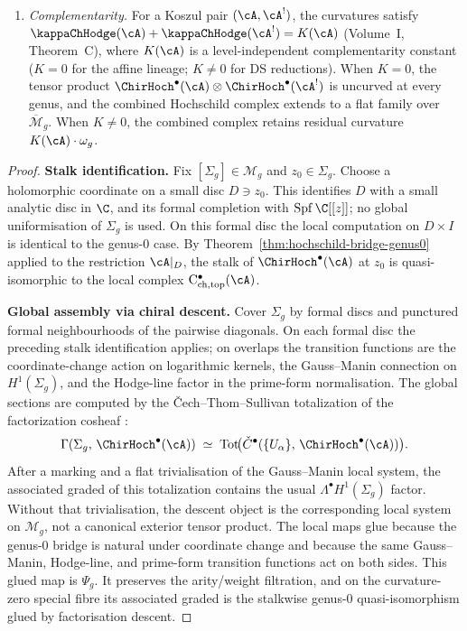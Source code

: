 \begin{theorem}
\begin{enumerate}[label=\textup{(\roman*)}]
\item \emph{Complementarity.}
 For a Koszul pair $(\cA, \cA^!)$, the curvatures satisfy
 $\kappaChHodge(\cA) + \kappaChHodge(\cA^!) = K(\cA)$
 (Volume~I, Theorem~C), where $K(\cA)$ is a level-independent
 complementarity constant ($K = 0$ for the affine lineage;
 $K \neq 0$ for DS reductions). When $K = 0$, the tensor product
 $\ChirHoch^\bullet(\cA) \otimes \ChirHoch^\bullet(\cA^!)$
 is uncurved at every genus, and the combined Hochschild
 complex extends to a flat family over
 $\overline{\mathcal{M}}_g$. When $K \neq 0$, the combined
 complex retains residual curvature $K(\cA) \cdot \omega_g$.
\end{enumerate}
\end{theorem}

\begin{proof}
\textbf{Stalk identification.}
Fix $[\Sigma_g] \in \mathcal{M}_g$ and $z_0 \in \Sigma_g$.
Choose a holomorphic coordinate on a small disc \(D\ni z_0\).  This
identifies \(D\) with a small analytic disc in \(\C\), and its formal
completion with \(\operatorname{Spf}\C[[z]]\); no global
uniformisation of \(\Sigma_g\) is used.  On this formal disc the local
computation on \(D\times I\) is identical to the genus-$0$ case. By
Theorem~\ref{thm:hochschild-bridge-genus0} applied to the
restriction $\cA|_D$, the stalk of $\ChirHoch^\bullet(\cA)$ at
$z_0$ is quasi-isomorphic to the local complex
$\mathrm{C}^\bullet_{\mathrm{ch,top}}(\cA)$.

\textbf{Global assembly via chiral descent.}
Cover $\Sigma_g$ by formal discs and punctured formal
neighbourhoods of the pairwise diagonals. On each formal disc the
preceding stalk identification applies; on overlaps the transition
functions are the coordinate-change action on logarithmic kernels,
the Gauss--Manin connection on \(H^1(\Sigma_g)\), and the Hodge-line
factor in the prime-form normalisation. The global sections are
computed by the \v{C}ech--Thom--Sullivan totalization of the
factorization cosheaf
\cite[Chapter~6]{CG17}:
\begin{equation}\label{eq:cech-ts}
\Gamma(\Sigma_g,\, \ChirHoch^\bullet(\cA))
\;\simeq\;
\mathrm{Tot}\!\bigl(
 \check{C}^\bullet(\{U_\alpha\},\,
 \ChirHoch^\bullet(\cA))
\bigr).
\end{equation}
After a marking and a flat trivialisation of the Gauss--Manin local
system, the associated graded of this totalization contains the usual
\(\Lambda^\bullet H^1(\Sigma_g)\) factor. Without that trivialisation,
the descent object is the corresponding local system on
\(\mathcal M_g\), not a canonical exterior tensor product.
The local maps glue because the genus-$0$ bridge is natural under
coordinate change and because the same Gauss--Manin, Hodge-line, and
prime-form transition functions act on both sides.  This glued map is
\(\Psi_g\).  It preserves the arity/weight filtration, and on the
curvature-zero special fibre its associated graded is the stalkwise
genus-$0$ quasi-isomorphism glued by factorisation descent.


\end{proof}
